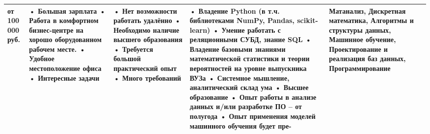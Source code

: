 \begin{landscape}
\begin{table}[H]
\begin{center}
\begin{small}
\begin{tabular}{|p{0.1cm}|p{5cm}|p{4.5cm}|p{4.5cm}|p{4cm}|p{3cm}|}
				от 100 000 руб.
				&
				• Большая зарплата
				\newline• Работа в комфортном бизнес-центре на хорошо оборудованном рабочем месте.
				\newline• Удобное местоположение офиса
				\newline• Интересные задачи
				&
				• Нет возможности работать удалённо
				\newline• Необходимо наличие высшего образования
				\newline• Требуется большой практический опыт
				\newline• Много требований
				&
				• Владение Python (в т.ч. библиотеками NumPy, Pandas, scikit-learn)
				\newline• Умение работать с реляционными СУБД, знание SQL
				\newline• Владение базовыми знаниями математической статистики и теории вероятностей на уровне выпускника ВУЗа
				\newline• Системное мышление, аналитический склад ума
				\newline• Высшее образование
				\newline• Опыт работы в анализе данных и/или разработке ПО – от полугода
				\newline• Опыт применения моделей машинного обучения будет пре-
				&
				Матанализ, Дискретная математика, Алгоритмы и структуры данных, Машинное обучение, Проектирование и реализация баз данных, Программирование
				\\
				\hline

					
				\end{tabular}
			\end{small}
		\end{center}
	\end{table}


\end{landscape}
